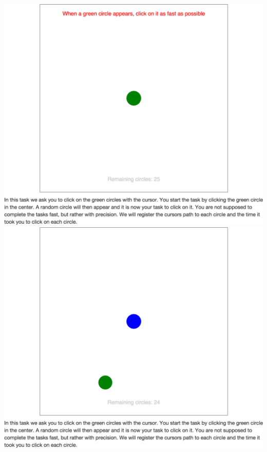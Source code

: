 \begin{appendices}
\begin{minipage}{\textwidth}
\centering
\includegraphics[height=.4\textheight]{images/screenshots/ex_step_6_pointing_start}
\label{fig:ex_step_6_pointing_start}
\includegraphics[height=.4\textheight]{images/screenshots/ex_step_6_pointing_target_1}
\label{fig:ex_step_6_pointing_target_1}
\end{minipage}


\end{appendices}
